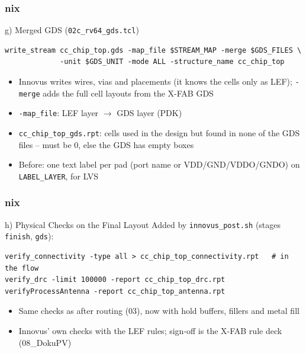 \documentclass{beamer}
\newcommand{\astitle}{nix}
\newcommand{\assubtitle}{nix}
\newcommand{\cmd}[1]{\texttt{#1}}
\begin{document}
\renewcommand{\assubtitle}{g) Merged GDS (\texttt{02c\_rv64\_gds.tcl})}
\begin{frame}[fragile]
\frametitle{\astitle}
\begin{block}{\assubtitle}
\begin{lstlisting}[style=sh]
write_stream cc_chip_top.gds -map_file $STREAM_MAP -merge $GDS_FILES \
             -unit $GDS_UNIT -mode ALL -structure_name cc_chip_top
\end{lstlisting}
  \begin{itemize}
    \item Innovus writes wires, vias and placements (it knows the cells only
      as LEF); \cmd{-merge} adds the full cell layouts from the X-FAB GDS
    \item \cmd{-map\_file}: LEF layer $\rightarrow$ GDS layer (PDK)
    \item \cmd{cc\_chip\_top\_gds.rpt}: cells used in the design but found
      in none of the GDS files -- must be 0, else the GDS has empty boxes
    \item Before: one text label per pad (port name or VDD/GND/VDDO/GNDO)
      on \cmd{LABEL\_LAYER}, for LVS
  \end{itemize}
\end{block}
\end{frame}

\renewcommand{\assubtitle}{h) Physical Checks on the Final Layout}
\begin{frame}[fragile]
\frametitle{\astitle}
\begin{block}{\assubtitle}
  \footnotesize
  Added by \cmd{innovus\_post.sh} (stages \cmd{finish}, \cmd{gds}):
\begin{lstlisting}[style=sh]
verify_connectivity -type all > cc_chip_top_connectivity.rpt   # in the flow
verify_drc -limit 100000 -report cc_chip_top_drc.rpt
verifyProcessAntenna -report cc_chip_top_antenna.rpt
\end{lstlisting}
  \begin{itemize}
    \item Same checks as after routing (03), now with hold buffers,
      fillers and metal fill
    \item Innovus' own checks with the LEF rules; sign-off is the X-FAB
      rule deck (08\_DokuPV)
  \end{itemize}
\end{block}
\end{frame}

\end{document}
